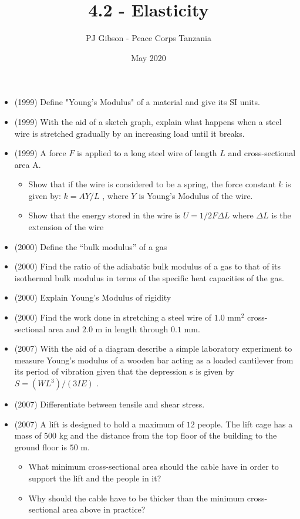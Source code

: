 \documentclass{article}
\title{\textbf{4.2 - Elasticity}}
\author{PJ Gibson - Peace Corps Tanzania}
\date{May 2020}
\begin{document}
\maketitle

\begin{itemize}
\item (1999)  Define "Young's Modulus" of a material and give its SI units.
\item (1999)  With the aid of a sketch graph, explain what happens when a steel wire is stretched gradually by an increasing load until it breaks. 
\item (1999)  A force $ F$ is applied to a long steel wire of length $ L$ and cross-sectional area A.
 \begin{itemize}
\item Show that if the wire is considered to be a spring, the force constant $ k$ is given by: $ k= AY/L$ , where $ Y$ is Young's Modulus of the wire.
\item Show that the energy stored in the wire is $ U=1/2F \Delta L$ where $ \Delta{L}$ is the extension of the wire
\end{itemize}
\item (2000)  Define the “bulk modulus” of a gas
\item (2000)  Find the ratio of the adiabatic bulk modulus of a gas to that of its isothermal bulk modulus in terms of the specific heat capacities of the gas.
\item (2000)  Explain Young’s Modulus of rigidity
\item (2000)  Find the work done in stretching a steel wire of $ 1.0$ mm$ ^{2}$ cross-sectional area and $ 2.0$ m in length through $ 0.1$ mm.
\item (2007)  With the aid of a diagram describe a simple laboratory experiment to measure Young’s modulus of a wooden bar acting as a loaded cantilever from its period of vibration given that the depression s is given by $ S=(WL^{3})/(3IE)$ . 
\item (2007)  Differentiate between tensile and shear stress. 
\item (2007)  A lift is designed to hold a maximum of $ 12$ people. The lift cage has a mass of $ 500$ kg and the distance from the top floor of the building to the ground floor is $ 50$ m.
 \begin{itemize}
\item What minimum cross-sectional area should the cable have in order to support the lift and the people in it?
\item Why should the cable have to be thicker than the minimum cross-sectional area above in practice? 

\end{itemize}
\end{itemize}
\end{document}
